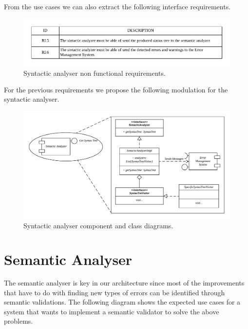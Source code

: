 From the use cases we can also extract the following interface requirements.

\begin{figure}[h!]
    \includegraphics[width=\textwidth]{images/sin-reqnf.pdf}
    \centering
    \caption[Syntactic analyser non functional requirements]{Syntactic analyser non functional requirements.}
    \label{fig:sin-reqnf}
\end{figure}

For the previous requirements we propose the following modulation for the syntactic analyser.

\begin{figure}[h!]
    \includegraphics[width=\textwidth]{images/sin-diagram.pdf}
    \centering
    \caption[Syntactic analyser component and class diagrams]{Syntactic analyser component and class diagrams.}
    \label{fig:sin-diag}
\end{figure}

\section{Semantic Analyser}
The semantic analyser is key in our architecture since most of the improvements
that have to do with finding new types of errors can be identified through semantic
validations. The following diagram shows the expected use cases for a system that
wants to implement a semantic validator to solve the above problems.

